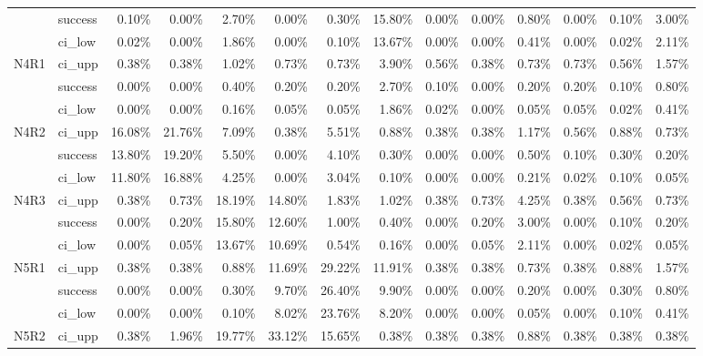 \begin{tabular}{llrrrrrrrrrrrr}
     & success &       0.10\% &  0.00\% &  2.70\% &  0.00\% &  0.30\% & 15.80\% &        0.00\% & 0.00\% & 0.80\% & 0.00\% & 0.10\% & 3.00\% \\
     & ci\_low &       0.02\% &  0.00\% &  1.86\% &  0.00\% &  0.10\% & 13.67\% &        0.00\% & 0.00\% & 0.41\% & 0.00\% & 0.02\% & 2.11\% \\
N4R1 & ci\_upp &       0.38\% &  0.38\% &  1.02\% &  0.73\% &  0.73\% &  3.90\% &        0.56\% & 0.38\% & 0.73\% & 0.73\% & 0.56\% & 1.57\% \\
     & success &       0.00\% &  0.00\% &  0.40\% &  0.20\% &  0.20\% &  2.70\% &        0.10\% & 0.00\% & 0.20\% & 0.20\% & 0.10\% & 0.80\% \\
     & ci\_low &       0.00\% &  0.00\% &  0.16\% &  0.05\% &  0.05\% &  1.86\% &        0.02\% & 0.00\% & 0.05\% & 0.05\% & 0.02\% & 0.41\% \\
N4R2 & ci\_upp &      16.08\% & 21.76\% &  7.09\% &  0.38\% &  5.51\% &  0.88\% &        0.38\% & 0.38\% & 1.17\% & 0.56\% & 0.88\% & 0.73\% \\
     & success &      13.80\% & 19.20\% &  5.50\% &  0.00\% &  4.10\% &  0.30\% &        0.00\% & 0.00\% & 0.50\% & 0.10\% & 0.30\% & 0.20\% \\
     & ci\_low &      11.80\% & 16.88\% &  4.25\% &  0.00\% &  3.04\% &  0.10\% &        0.00\% & 0.00\% & 0.21\% & 0.02\% & 0.10\% & 0.05\% \\
N4R3 & ci\_upp &       0.38\% &  0.73\% & 18.19\% & 14.80\% &  1.83\% &  1.02\% &        0.38\% & 0.73\% & 4.25\% & 0.38\% & 0.56\% & 0.73\% \\
     & success &       0.00\% &  0.20\% & 15.80\% & 12.60\% &  1.00\% &  0.40\% &        0.00\% & 0.20\% & 3.00\% & 0.00\% & 0.10\% & 0.20\% \\
     & ci\_low &       0.00\% &  0.05\% & 13.67\% & 10.69\% &  0.54\% &  0.16\% &        0.00\% & 0.05\% & 2.11\% & 0.00\% & 0.02\% & 0.05\% \\
N5R1 & ci\_upp &       0.38\% &  0.38\% &  0.88\% & 11.69\% & 29.22\% & 11.91\% &        0.38\% & 0.38\% & 0.73\% & 0.38\% & 0.88\% & 1.57\% \\
     & success &       0.00\% &  0.00\% &  0.30\% &  9.70\% & 26.40\% &  9.90\% &        0.00\% & 0.00\% & 0.20\% & 0.00\% & 0.30\% & 0.80\% \\
     & ci\_low &       0.00\% &  0.00\% &  0.10\% &  8.02\% & 23.76\% &  8.20\% &        0.00\% & 0.00\% & 0.05\% & 0.00\% & 0.10\% & 0.41\% \\
N5R2 & ci\_upp &       0.38\% &  1.96\% & 19.77\% & 33.12\% & 15.65\% &  0.38\% &        0.38\% & 0.38\% & 0.88\% & 0.38\% & 0.38\% & 0.38\% \\

\end{tabular}
